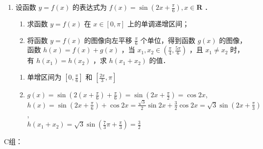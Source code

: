 \begin{enumerate}
\item 设函数 $y=f(x)$ 的表达式为 $f(x)=\sin \left(2 x+\frac{\pi}{6}\right), x \in \mathbf{R}$ ．
\begin{enumerate}
    \item 求函数 $y=f(x)$ 在 $x \in[0, \pi]$ 上的单调递增区间；
    \item 将函数 $y=f(x)$ 的图像向左平移 $\frac{\pi}{6}$ 个单位，得到函数 $g(x)$ 的图像，函数 $h(x)=f(x)+g(x)$ ，当 $x_1, x_2 \in\left(\frac{\pi}{4}, \frac{5 \pi}{6}\right)$ ，且 $x_1 \neq x_2$ 时，有 $h\left(x_1\right)=h\left(x_2\right)$ ，求 $h\left(x_1+x_2\right)$ 的值．
\end{enumerate}  
\begin{jieda}
\begin{enumerate}
    \item 单增区间为 $\left[0, \frac{\pi}{6}\right]$ 和 $\left[\frac{2 \pi}{3}, \pi\right]$
    \item $g(x)=\sin \left(2\left(x+\frac{\pi}{6}\right)+\frac{\pi}{6}\right)=\sin \left(2 x+\frac{\pi}{2}\right)=\cos 2 x$, \\ $h(x)=\sin \left(2 x+\frac{\pi}{6}\right)+\cos 2 x=\frac{\sqrt{3}}{2} \sin 2 x+\frac{3}{2} \cos 2 x=\sqrt{3} \sin \left(2 x+\frac{\pi}{3}\right)$, \\
    $h\left(x_1+x_2\right)=\sqrt{3} \sin \left(\frac{7}{3} \pi+\frac{\pi}{3}\right)=\frac{3}{2}$
\end{enumerate}
\end{jieda}

\end{enumerate}

C组：

